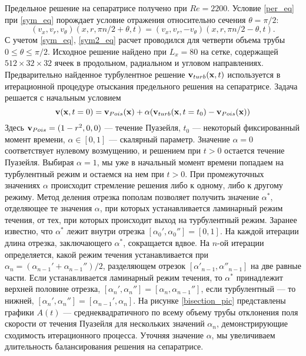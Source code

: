 Предельное решение на сепаратрисе получено при $Re=2200$. Условие \eqref{per_eq} при \eqref{sym_eq} порождает условие отражения относительно сечения $\theta = \pi/2$:
\begin{equation} \label{sym2_eq}
(v_x, v_r, v_\theta)(x, r, \pi n/2 + \theta, t) = (v_x, v_r, -v_\theta)(x, r, \pi n / 2 - \theta, t).
\end{equation}
С учетом \eqref{sym_eq}, \eqref{sym2_eq} расчет проводился для четверти объема трубы $0\leqslant\theta\leqslant\pi/2$. Исходное решение найдено при $L_x = 80$ на сетке, содержащей $512 \times 32 \times  32$ ячеек в продольном, радиальном и угловом направлениях. Предварительно найденное турбулентное решение $\mathbf{v}_{turb}(\mathbf{x},t)$ используется в итерационной процедуре отыскания предельного решения на сепаратрисе. Задача решается с начальным условием
\begin{equation} \label{edge_init_eq}
\mathbf{v}(\mathbf{x},t=0) = \mathbf{v}_{Pois}(\mathbf{x})+\alpha(\mathbf{v}_{turb}(\mathbf{x},t=t_0) - \mathbf{v}_{Pois}(\mathbf{x}))
\end{equation}
Здесь $\mathbf{v}_{Pois}=(1-r^2,0,0)$ --- течение Пуазейля, $t_0$ --- некоторый фиксированный момент времени, $\alpha \in [0,1]$ --- скалярный параметр. Значение $\alpha=0$ соответствует нулевому возмущению, и решением при $t>0$ остается течение Пуазейля. Выбирая $\alpha=1$, мы уже в начальный момент времени попадаем на турбулентный режим и остаемся на нем при $t>0$. При промежуточных значениях $\alpha$ происходит стремление решения либо к одному, либо к другому режиму. Метод деления отрезка пополам позволяет получить значение $\alpha^*$, отделяющее те значения $\alpha$, при которых устанавливается ламинарный режим течения, от тех, при которых происходит выход на турбулентный режим. Заранее известно, что $\alpha^*$ лежит внутри отрезка $[\alpha_0', \alpha_0''] = [0,1]$. На каждой итерации длина отрезка, заключающего $\alpha^*$, сокращается вдвое. На $n$-ой итерации определяется, какой режим течения устанавливается при $\alpha_{n} = (\alpha_{n-1}' + \alpha_{n-1}'') / 2$, разделяющем отрезок $[\alpha'_{n-1}, \alpha''_{n-1}]$ на две равные части. Если устанавливается ламинарный режим течения, то $\alpha^*$ принадлежит верхней половине отрезка, $[\alpha_{n}', \alpha_{n}''] = [\alpha_{n}, \alpha_{n-1}'']$, если турбулентный --- то нижней, $[\alpha_{n}', \alpha_{n}''] = [\alpha_{n-1}', \alpha_{n}]$. На рисунке \ref{bisection_pic} представлены графики $A(t)$ --- среднеквадратичного по всему объему трубы отклонения поля скорости от течения Пуазейля для нескольких значений $\alpha_n$, демонстрирующие сходимость итерационного процесса. Уточняя значение $\alpha$, мы увеличиваем длительность балансирования решения на сепаратрисе. 


